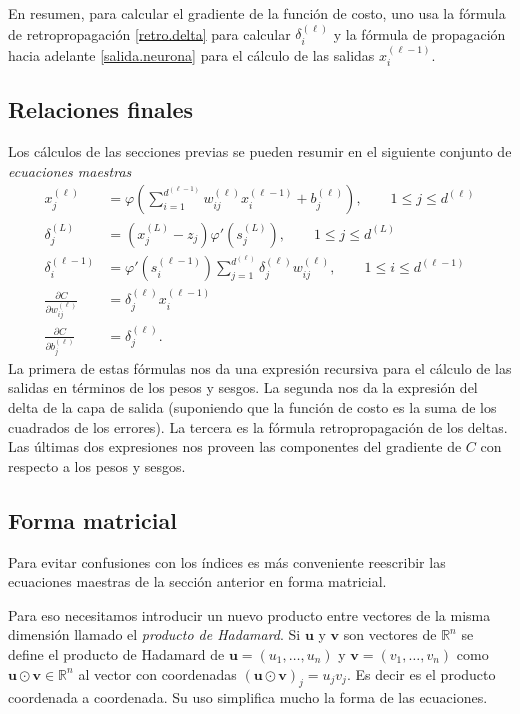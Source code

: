 \documentclass[12pt, a4paper]{amsbook}
\newcommand{\R}{{\mathbb R}}
\newcommand{\uu}{{\mathbf u}}
\newcommand{\vv}{{\mathbf v}}
\theoremstyle{remark}
\theoremstyle{definition}
\numberwithin{section}{chapter}
\numberwithin{subsection}{section}
\numberwithin{equation}{section}
\numberwithin{figure}{chapter}
\begin{document}
En resumen, para calcular el gradiente de la función de costo, uno usa la fórmula de retropropagación \eqref{retro.delta} para calcular $\delta_i^{(\ell)}$ y la fórmula de propagación hacia adelante \eqref{salida.neurona} para el cálculo de las salidas $x_i^{(\ell-1)}$.

\subsection{Relaciones finales}
Los cálculos de las secciones previas se pueden resumir en el siguiente conjunto de {\em ecuaciones maestras}
\begin{align}
x_j^{(\ell)} &= \varphi\left(\sum_{i=1}^{d^{(\ell-1)}} w_{ij}^{(\ell)} x_i^{(\ell-1)} + b_j^{(\ell)}\right),\qquad 1\le j\le d^{(\ell)}\\
\delta_j^{(L)} &= (x_j^{(L)} - z_j)\varphi'(s_j^{(L)}),\qquad 1\le j\le d^{(L)}\\
\delta_i^{(\ell-1)} &= \varphi'(s_i^{(\ell-1)}) \sum_{j=1}^{d^{(\ell)}} \delta_j^{(\ell)} w_{ij}^{(\ell)},\qquad 1\le i\le d^{(\ell-1)}\\
\frac{\partial C}{\partial w_{ij}^{(\ell)}} &= \delta_j^{(\ell)} x_i^{(\ell-1)}\\
\frac{\partial C}{\partial b_j^{(\ell)}} &= \delta_j^{(\ell)}.
\end{align}
La primera de estas fórmulas nos da una expresión recursiva para el cálculo de las salidas en términos de los pesos y sesgos. La segunda nos da la expresión del delta de la capa de salida (suponiendo que la función de costo es la suma de los cuadrados de los errores). La tercera es la fórmula retropropagación de los deltas. Las últimas dos expresiones nos proveen las componentes del gradiente de $C$ con respecto a los pesos y sesgos.

\subsection{Forma matricial}
Para evitar confusiones con los índices es más conveniente reescribir las ecuaciones maestras de la sección anterior en forma matricial.

Para eso necesitamos introducir un nuevo producto entre vectores de la misma dimensión llamado el {\em producto de Hadamard}. Si $\uu$ y $\vv$ son vectores de $\R^n$ se define el producto de Hadamard de $\uu=(u_1,\dots, u_n)$ y $\vv=(v_1,\dots, v_n)$ como $\uu\odot\vv\in \R^n$ al vector con coordenadas $(\uu\odot\vv)_j = u_j v_j$. Es decir es el producto coordenada a coordenada. Su uso simplifica mucho la forma de las ecuaciones.
\end{document}
